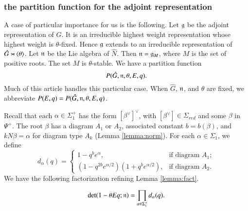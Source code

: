\subsubsection{the partition function for the adjoint representation}

A case of particular importance for us is the following.
Let ${\mathfrak g}$ be the adjoint representation of  $\hat G$.   It is an irreducible highest weight representation whose highest weight is $\theta$-fixed.
Hence ${\mathfrak g}$ extends to an irreducible representation of $\hat G\rtimes\langle{\theta}\rangle$.
Let ${\mathfrak n}$ be the Lie algebra of $\hat N$.  Then ${\mathfrak n} = {\mathfrak g}_M$, where $M$ is the set of positive roots.  The set $M$ is $\theta$-stable.
We have a partition function
\[
P(\hat G,{\mathfrak n},\theta,E,q).
\]
Much of this article handles this particular case.  When $\hat G$, ${\mathfrak n}$, and $\theta$ are fixed, we abbreviate
$P(E,q) = P(\hat G,{\mathfrak n},\theta,E,q)$.


Recall that each $\alpha\in \Sigma^+_1$ has the form $[\beta^\vee]^\vee$, with $[\beta^\vee]\in \Sigma_{red}$
and some $\beta$  in $\Psi^+$.  The root $\beta$ has a diagram $A_1$ or $A_2$,
associated constant $b=b(\beta)$, and $k N\beta = \alpha$ for diagram type $A_k$ (Lemma \ref{lemma:norm}).
For each $\alpha\in \Sigma_1$, we define
\begin{equation}\label{eqn:d}
d_\alpha(q) =
\begin{cases} {1-q^b e^\alpha},    &\text{if diagram } A_1;\\
{(1-q^{2b} e^{\alpha/2})(1+q^b e^{\alpha/2})},
&\text{if diagram } A_2.
\end{cases}
\end{equation}
We have the following factorization refining Lemma \ref{lemma:fact}.

\begin{lemma} \label{lemma:prod}
\[
\det(1-\theta  E q ;{\mathfrak n}) = \prod_{\alpha\in\Sigma^+_1} d_\alpha(q).
\]
\end{lemma}

